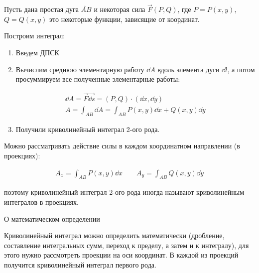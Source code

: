 
Пусть дана простая дуга \(\breve{AB}\) и некоторая сила \(\vec{F}(P, Q)\), где
\(P = P(x, y)\), \(Q = Q(x, y)\) это некоторые функции, зависящие от координат.

Построим интеграл:
\begin{enumerate}
  \item Введем ДПСК
  \item Вычислим среднюю элементарную работу \(\dd A\) вдоль элемента дуги
  \(\dd l\), а потом просуммируем все полученные элементарные работы:
  
  \begin{twocolumns}
    \begin{align*}
      \dd A = \vec{F} \vec{\dd s} = (P, Q) \cdot (\dd x, \dd y) \\
      A = \int_{AB} \dd A = \int_{AB} P(x, y) \dd x + Q(x, y) \dd y
    \end{align*}
    \columnbreak

    
  \end{twocolumns}

  \item Получили криволинейный интеграл 2-ого рода.
\end{enumerate}

\begin{remark}
  Можно рассматривать действие силы в каждом координатном направлении
  (в проекциях):

  \begin{align*}
    A_{x} = \int_{AB} P(x, y) \dd x \qquad
    A_{y} = \int_{AB} Q(x, y) \dd y
  \end{align*}

  поэтому криволинейный интеграл 2-ого рода иногда называют криволинейным
  интегралов в проекциях.
\end{remark}

\begin{remark}
  О математическом определении

  Криволинейный интеграл можно определить математически (дробление, составление
  интегральных сумм, переход к пределу, а затем и к интегралу), для этого нужно
  рассмотреть проекции на оси координат. В каждой из проекций получится
  криволинейный интеграл первого рода.
\end{remark}


